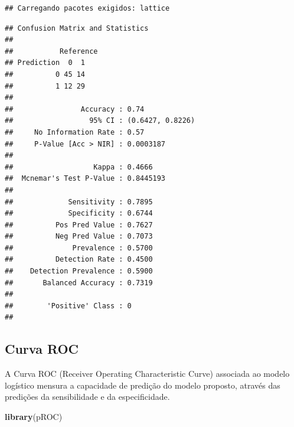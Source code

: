 \documentclass[12pt,brazil,]{book}
\newenvironment{Shaded}{\begin{snugshade}}{\end{snugshade}}
\newcommand{\DataTypeTok}[1]{\textcolor[rgb]{0.13,0.29,0.53}{#1}}
\newcommand{\FloatTok}[1]{\textcolor[rgb]{0.00,0.00,0.81}{#1}}
\newcommand{\KeywordTok}[1]{\textcolor[rgb]{0.13,0.29,0.53}{\textbf{#1}}}
\newcommand{\NormalTok}[1]{#1}
\newcommand{\OperatorTok}[1]{\textcolor[rgb]{0.81,0.36,0.00}{\textbf{#1}}}
\newcommand{\StringTok}[1]{\textcolor[rgb]{0.31,0.60,0.02}{#1}}
\begin{document}
\begin{verbatim}
## Carregando pacotes exigidos: lattice
\end{verbatim}

\begin{Shaded}
\end{Shaded}

\begin{verbatim}
## Confusion Matrix and Statistics
## 
##           Reference
## Prediction  0  1
##          0 45 14
##          1 12 29
##                                           
##                Accuracy : 0.74            
##                  95% CI : (0.6427, 0.8226)
##     No Information Rate : 0.57            
##     P-Value [Acc > NIR] : 0.0003187       
##                                           
##                   Kappa : 0.4666          
##  Mcnemar's Test P-Value : 0.8445193       
##                                           
##             Sensitivity : 0.7895          
##             Specificity : 0.6744          
##          Pos Pred Value : 0.7627          
##          Neg Pred Value : 0.7073          
##              Prevalence : 0.5700          
##          Detection Rate : 0.4500          
##    Detection Prevalence : 0.5900          
##       Balanced Accuracy : 0.7319          
##                                           
##        'Positive' Class : 0               
## 
\end{verbatim}

\hypertarget{curva-roc}{%
\subsection{Curva ROC}\label{curva-roc}}

A Curva ROC (Receiver Operating Characteristic Curve) associada ao
modelo logístico mensura a capacidade de predição do modelo proposto,
através das predições da sensibilidade e da especificidade.

\begin{Shaded}
\begin{Highlighting}[]
\KeywordTok{library}\NormalTok{(pROC)}
\end{Highlighting}
\end{Shaded}
\end{document}
